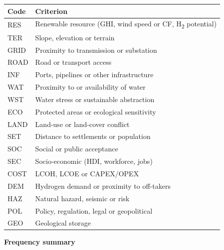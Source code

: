 \documentclass[11pt,a4paper]{article}
\begin{document}
\begin{center}\footnotesize
\begin{tabularx}{\textwidth}{l>{\hsize=1.000\hsize\raggedright\arraybackslash}X}
\toprule
\textbf{Code} & \textbf{Criterion} \\
\midrule
RES & Renewable resource (GHI, wind speed or CF, H\textsubscript{2} potential) \\
TER & Slope, elevation or terrain \\
GRID & Proximity to transmission or substation \\
ROAD & Road or transport access \\
INF & Ports, pipelines or other infrastructure \\
WAT & Proximity to or availability of water \\
WST & Water stress or sustainable abstraction \\
ECO & Protected areas or ecological sensitivity \\
LAND & Land-use or land-cover conflict \\
SET & Distance to settlements or population \\
SOC & Social or public acceptance \\
SEC & Socio-economic (HDI, workforce, jobs) \\
COST & LCOH, LCOE or CAPEX/\allowbreak{}OPEX \\
DEM & Hydrogen demand or proximity to off-takers \\
HAZ & Natural hazard, seismic or risk \\
POL & Policy, regulation, legal or geopolitical \\
GEO & Geological storage \\
\bottomrule
\end{tabularx}
\end{center}

\textbf{Frequency summary}
\end{document}
